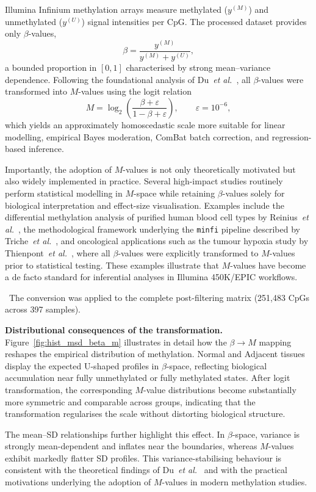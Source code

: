 \documentclass[10pt]{extarticle}
\newcommand{\good}[1]{\textcolor{teal!70!black}{\ding{51}~#1}}
\begin{document}
Illumina Infinium methylation arrays measure methylated ($y^{(M)}$) and unmethylated ($y^{(U)}$) signal intensities per CpG. 
The processed dataset provides only $\beta$-values,
\[
\beta = \frac{y^{(M)}}{y^{(M)} + y^{(U)}},
\]
a bounded proportion in $[0,1]$ characterised by strong mean–variance dependence. 
Following the foundational analysis of Du~\textit{et al.}~\cite{Du2010}, all $\beta$-values were transformed into $M$-values using the logit relation
\[
M = \log_2\!\left(\frac{\beta + \varepsilon}{1 - \beta + \varepsilon}\right),
\qquad \varepsilon = 10^{-6},
\]
which yields an approximately homoscedastic scale more suitable for linear modelling, empirical Bayes moderation, ComBat batch correction, and regression-based inference.

Importantly, the adoption of $M$-values is not only theoretically motivated but also widely implemented in practice.  
Several high-impact studies routinely perform statistical modelling in $M$-space while retaining $\beta$-values solely for biological interpretation and effect-size visualisation.  
Examples include the differential methylation analysis of purified human blood cell types by Reinius~\textit{et al.}~\cite{Reinius2012}, the methodological framework underlying the \texttt{minfi} pipeline described by Triche~\textit{et al.}~\cite{Triche2013}, and oncological applications such as the tumour hypoxia study by Thienpont~\textit{et al.}~\cite{Thienpont2016}, where all $\beta$-values were explicitly transformed to $M$-values prior to statistical testing.  
These examples illustrate that $M$-values have become a de facto standard for inferential analyses in Illumina 450K/EPIC workflows.

\good{The conversion was applied to the complete post-filtering matrix (251{,}483 CpGs across 397 samples).}  

\textbf{Distributional consequences of the transformation.}
Figure~\ref{fig:hist_msd_beta_m} illustrates in detail how the $\beta \rightarrow M$ mapping reshapes the empirical distribution of methylation.  
Normal and Adjacent tissues display the expected U-shaped profiles in $\beta$-space, reflecting biological accumulation near fully unmethylated or fully methylated states.  
After logit transformation, the corresponding $M$-value distributions become substantially more symmetric and comparable across groups, indicating that the transformation regularises the scale without distorting biological structure.

The mean–SD relationships further highlight this effect.  
In $\beta$-space, variance is strongly mean-dependent and inflates near the boundaries, whereas $M$-values exhibit markedly flatter SD profiles.  
This variance-stabilising behaviour is consistent with the theoretical findings of Du~\textit{et al.}~\cite{Du2010} and with the practical motivations underlying the adoption of $M$-values in modern methylation studies.
\end{document}

